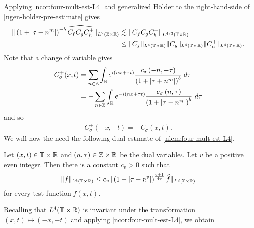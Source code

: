 %
%
Applying \cref{ncor:four-mult-est-L4} and generalized H\"{o}lder to the 
right-hand-side of \eqref{ngen-holder-pre-estimate} gives
%
%
\begin{equation}
	\label{ngen-holder-piece-1}
	\begin{split}
		\|\left( 1 + | \tau - n^{m } | \right)^{-b} \widehat{C_f C_{ 
		g } C^+_{h}}\|_{L^2(\mathbb{Z} \times \mathbb{R})}
		& \lesssim  \|C_f C_{g} C^+_{h} \|_{L^{4/3}(\mathbb{T} \times \mathbb{R})}
		\\
		& \le \|C_f \|_{L^4(\mathbb{T} \times \mathbb{R})} \|C_{g}\|_{L^4(\mathbb{T} \times \mathbb{R})} 
		\|C^+_{h}\|_{L^4(\mathbb{T} \times \mathbb{R})}.
	\end{split}
\end{equation}
%
%
Note that a change of variable gives
%
%
\begin{equation*}
	\begin{split}
		C_\sigma^+(x, t)
		& = \sum_{n \in \mathbb{Z}} \int_{\mathbb{R}} e^{i(nx +  \tau t)} \frac{c_\sigma\left( -n, -\tau \right)}{\left( 
		1 + | \tau + n^{m } | \right)^{b}} \ d \tau
		\\
		& = - \sum_{n \in \mathbb{Z}} \int_{\mathbb{R}} e^{-i(nx +   \tau t )}
		\frac{c_\sigma\left( n, \tau \right)}{\left( 
		1 + | \tau - n^{m } | \right)^{b}} \ d \tau
	\end{split}
\end{equation*}
%
%
and so
%
%
\begin{equation*}
	\begin{split}
		C_\sigma^+(-x, -t) = -C_\sigma(x, t).
	\end{split}
\end{equation*}
%
%
We will now the need the following dual estimate of
\cref{nlem:four-mult-est-L4}.
%
\begin{corollary}
	\label{ncor:four-mult-est-L4}
	Let $(x, t) \in \mathbb{T} \times \mathbb{R} $ and $(n, \tau) \in \mathbb{Z} \times \mathbb{R}$ be 
	the dual variables. Let $v$ be a positive even integer. Then there is a 
	constant $c_v > 0$ such that
%
%
\begin{equation}
	\label{nfour-mult-est-L4}
	\begin{split}
		\|f\|_{L^4(\mathbb{T} \times \mathbb{R})} \le c_v \|\left( 1 + | \tau - n^v | 
		\right)^\frac{v+1}{4v} \widehat{f} \|_{L^2( \mathbb{Z} \times \mathbb{R})}
	\end{split}
\end{equation}
for every test function $f(x, t)$. 
%
%
%
%
\end{corollary}
%
%
Recalling that $L^4(\mathbb{T} \times \mathbb{R})$ is invariant under the transformation $(x, 
t) \mapsto (-x,-t)$ and applying 
\cref{ncor:four-mult-est-L4}, we obtain
%
%

